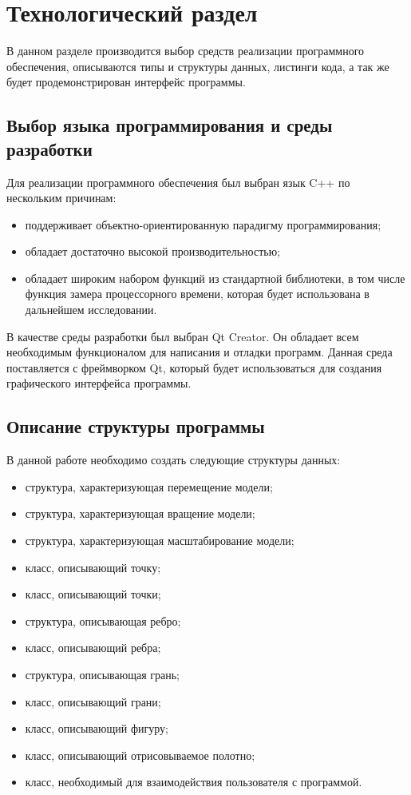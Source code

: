 \chapter{Технологический раздел}
В данном разделе производится выбор средств реализации программного обеспечения, описываются типы и структуры данных, листинги кода, а так же будет продемонстрирован интерфейс программы.

\section{Выбор языка программирования и среды разработки}

Для реализации программного обеспечения был выбран язык C++ по нескольким причинам:
\begin{itemize}
	\item поддерживает объектно-ориентированную парадигму программирования;
	\item обладает достаточно высокой производительностью;
	\item обладает широким набором функций из стандартной библиотеки, в том числе функция замера процессорного времени, которая будет использована в дальнейшем исследовании.
\end{itemize}

В качестве среды разработки был выбран Qt Creator. Он обладает всем необходимым функционалом для написания и отладки программ. Данная среда поставляется с фреймворком Qt, который будет использоваться для создания графического интерфейса программы.


\section{Описание структуры программы}
В данной работе необходимо создать следующие структуры данных:

\begin{itemize}
	\item структура, характеризующая перемещение модели;
	\item структура, характеризующая вращение модели;
	\item структура, характеризующая масштабирование модели;
	\item класс, описывающий точку;
	\item класс, описывающий точки;
	\item структура, описывающая ребро;
	\item класс, описывающий ребра;
	\item структура, описывающая грань;
	\item класс, описывающий грани;
	\item класс, описывающий фигуру;
	\item класс, описывающий отрисовываемое полотно;
	\item класс, необходимый для взаимодействия пользователя с программой.
\end{itemize}


